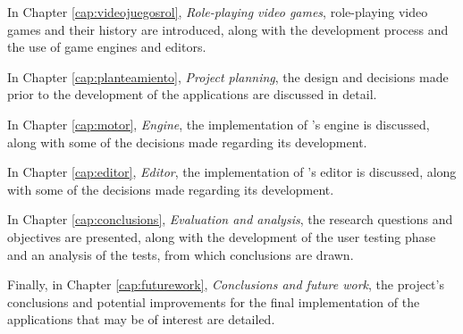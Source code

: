 \medskip

In Chapter \ref{cap:videojuegosrol}, \textit{Role-playing video games}, role-playing video games and their history are introduced, along with the development process and the use of game engines and editors.

\medskip

In Chapter \ref{cap:planteamiento}, \textit{Project planning}, the design and decisions made prior to the development of the applications are discussed in detail.

\medskip

In Chapter \ref{cap:motor}, \textit{Engine}, the implementation of \baker's engine is discussed, along with some of the decisions made regarding its development.
\medskip

In Chapter \ref{cap:editor}, \textit{Editor}, the implementation of \baker's editor is discussed, along with some of the decisions made regarding its development.

\medskip

In Chapter \ref{cap:conclusions}, \textit{Evaluation and analysis}, the research questions and objectives are presented, along with the development of the user testing phase and an analysis of the tests, from which conclusions are drawn.

\medskip

Finally, in Chapter \ref{cap:futurework}, \textit{Conclusions and future work}, the project's conclusions and potential improvements for the final implementation of the applications that may be of interest are detailed.








